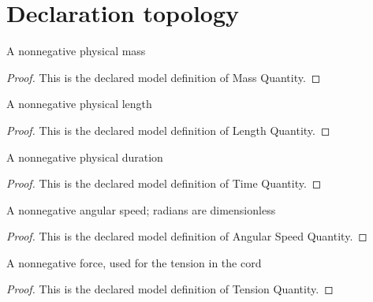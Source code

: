 \section{Declaration topology}
\begin{definition}
  \label{def:physics:phyx-mini-0243:phyxminiproblems-problemphyxmini0243-massquantity}
  A nonnegative physical mass
\end{definition}
\begin{proof}
  This is the declared model definition of Mass Quantity.
\end{proof}
\begin{definition}
  \label{def:physics:phyx-mini-0243:phyxminiproblems-problemphyxmini0243-lengthquantity}
  A nonnegative physical length
\end{definition}
\begin{proof}
  This is the declared model definition of Length Quantity.
\end{proof}
\begin{definition}
  \label{def:physics:phyx-mini-0243:phyxminiproblems-problemphyxmini0243-timequantity}
  A nonnegative physical duration
\end{definition}
\begin{proof}
  This is the declared model definition of Time Quantity.
\end{proof}
\begin{definition}
  \label{def:physics:phyx-mini-0243:phyxminiproblems-problemphyxmini0243-angularspeedquantity}
  A nonnegative angular speed; radians are dimensionless
\end{definition}
\begin{proof}
  This is the declared model definition of Angular Speed Quantity.
\end{proof}
\begin{definition}
  \label{def:physics:phyx-mini-0243:phyxminiproblems-problemphyxmini0243-tensionquantity}
  A nonnegative force, used for the tension in the cord
\end{definition}
\begin{proof}
  This is the declared model definition of Tension Quantity.
\end{proof}
